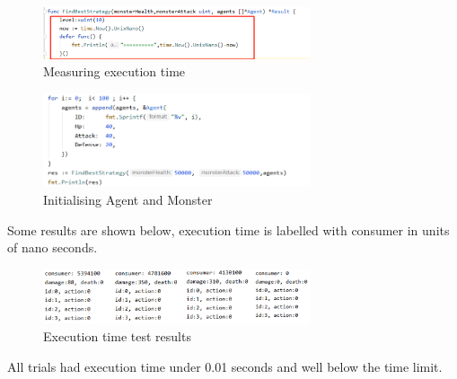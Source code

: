 \noindent

\begin{figure}[htb]
    \centering
    \includegraphics[width=0.7\textwidth]{008_team_5_agent_design/images/10.png}
    \caption{Measuring execution time}
    \label{testingexecutiontime}
\end{figure}

\noindent   

\begin{figure}[!ht]
    \centering
    \includegraphics[width=0.7\textwidth]{008_team_5_agent_design/images/11.png}
    \caption{Initialising Agent and Monster}
    \label{initialisingagentandmonster}
\end{figure}

\noindent

\noindent Some results are shown below, execution time is labelled with consumer in units of nano seconds.

\noindent

\begin{figure}[!ht]
    \centering
    \includegraphics[width=0.7\textwidth]{008_team_5_agent_design/images/12.png}
    \caption{Execution time test results}
    \label{executiontimetestresults}
\end{figure}

\noindent

\noindent All trials had execution time under 0.01 seconds and well below the time limit.

